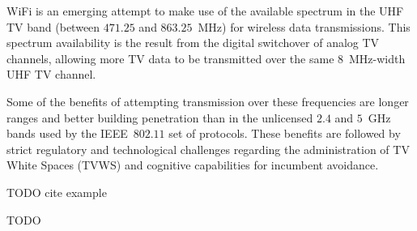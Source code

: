  WiFi is an emerging attempt to make use of the available spectrum in the UHF TV band (between $471.25$ and $863.25$~MHz) for wireless data transmissions. This spectrum availability is the result from the digital switchover of analog TV channels, allowing more TV data to be transmitted over the same $8$~MHz-width UHF TV channel.

Some of the benefits of attempting transmission over these frequencies are longer ranges and better building penetration than in the unlicensed $2.4$ and $5$~GHz bands used by the IEEE~$802.11$ set of protocols. These benefits are followed by strict regulatory and technological challenges regarding the administration of TV White Spaces (TVWS) and cognitive capabilities for incumbent avoidance.

TODO cite example~\cite{shellhammer2009technical}


TODO
